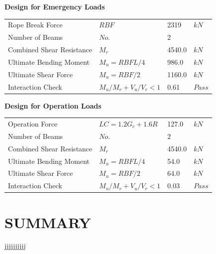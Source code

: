 \documentclass{article}%
\begin{document}
\textbf{Design for Emergency Loads}%
\begin{flushleft}%
\begin{minipage}{\textwidth}%
\flushleft%
\begin{tabular}{l l l l}%
Rope Break Force&$RBF$&2319&$kN$\\%
Number of Beams&$No.$&2&\\%
Combined Shear Resistance&$M_r$&4540.0&$kN$\\%
Ultimate Bending Moment&$M_u = RBF L/4$&986.0&$kN$\\%
Ultimate Shear Force&$M_u = RBF/2$&1160.0&$kN$\\%
Interaction Check&$M_u/M_r + V_u/V_r < 1$&0.61&$Pass$\\%
\end{tabular}%
\end{minipage}%
\end{flushleft}%
\textbf{Design for Operation Loads}%
\begin{flushleft}%
\begin{minipage}{\textwidth}%
\flushleft%
\begin{tabular}{l l l l}%
Operation Force&$LC = 1.2G_c + 1.6R$&127.0&$kN$\\%
Number of Beams&$No.$&2&\\%
Combined Shear Resistance&$M_r$&4540.0&$kN$\\%
Ultimate Bending Moment&$M_u = RBF L/4$&54.0&$kN$\\%
Ultimate Shear Force&$M_u = RBF/2$&64.0&$kN$\\%
Interaction Check&$M_u/M_r + V_u/V_r < 1$&0.03&$Pass$\\%
\end{tabular}%
\end{minipage}%
\end{flushleft}

%
\newpage

%
\section{SUMMARY}%
\label{sec:SUMMARY}%
jjjjjjjjjj

%
\end{document}
